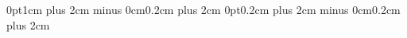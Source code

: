 \documentclass[11pt]{paper}
\author{Tamas Spisak}
\date{2020}
\title{\mytitle} %
\begin{document}
    \titlespacing*{\section}
    {0pt}{1cm plus 2cm minus 0cm}{0.2cm plus 2cm}
    \titlespacing*{\subsection}
    {0pt}{0.2cm plus 2cm minus 0cm}{0.2cm plus 2cm}

    \frontpage
    
    
    \setcounter{page}{2}

    \begin{large}
    
    
    
        
    \end{large}

    
    \footnotesize
    {\linespread{0}\selectfont}
\end{document}
